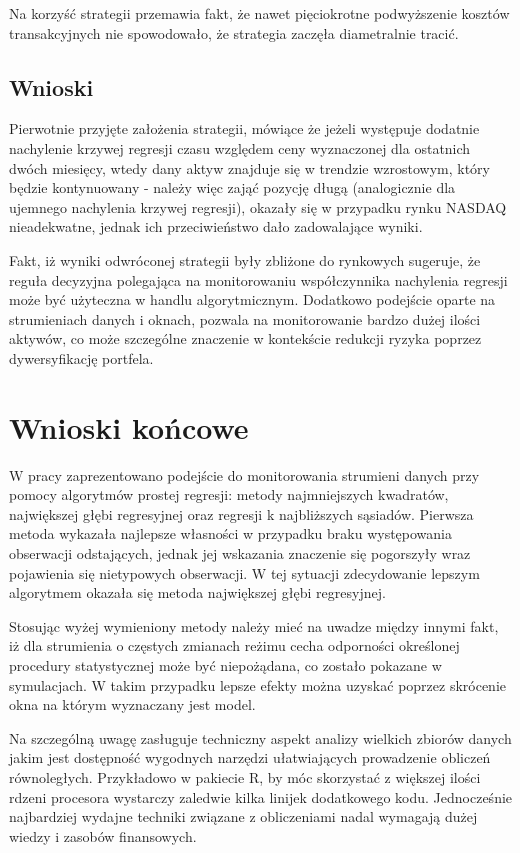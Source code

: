 \documentclass[man,mfu]{mgrwms}
\begin{document}
Na korzyść strategii przemawia fakt, że nawet pięciokrotne podwyższenie kosztów transakcyjnych nie spowodowało, że strategia zaczęła diametralnie tracić.

\section{Wnioski}

Pierwotnie przyjęte założenia strategii, mówiące że jeżeli występuje dodatnie nachylenie krzywej regresji czasu względem ceny wyznaczonej dla ostatnich dwóch miesięcy, wtedy dany aktyw znajduje się w trendzie wzrostowym, który będzie kontynuowany - należy więc zająć pozycję długą (analogicznie dla ujemnego nachylenia krzywej regresji), okazały się w przypadku rynku NASDAQ nieadekwatne, jednak ich przeciwieństwo dało zadowalające wyniki. 

Fakt, iż wyniki odwróconej strategii były zbliżone do rynkowych sugeruje, że reguła decyzyjna polegająca na monitorowaniu współczynnika nachylenia regresji może być użyteczna w handlu algorytmicznym. Dodatkowo podejście oparte na strumieniach danych i oknach, pozwala na monitorowanie bardzo dużej ilości aktywów, co może szczególne znaczenie w kontekście redukcji ryzyka poprzez dywersyfikację portfela.

\chapter{Wnioski końcowe}

W pracy zaprezentowano podejście do monitorowania strumieni danych przy pomocy  algorytmów prostej regresji: metody najmniejszych kwadratów, największej głębi regresyjnej oraz regresji k najbliższych sąsiadów. Pierwsza metoda wykazała najlepsze własności w przypadku braku występowania obserwacji odstających, jednak jej wskazania znaczenie się pogorszyły wraz pojawienia się nietypowych obserwacji. W tej sytuacji zdecydowanie lepszym algorytmem okazała się metoda największej głębi regresyjnej.

Stosując wyżej wymieniony metody należy mieć na uwadze między innymi fakt, iż dla strumienia o częstych zmianach reżimu cecha odporności określonej procedury statystycznej może być niepożądana, co zostało pokazane w symulacjach. W takim przypadku lepsze efekty można uzyskać poprzez skrócenie okna na którym wyznaczany jest model.

Na szczególną uwagę zasługuje techniczny aspekt analizy wielkich zbiorów danych jakim jest dostępność wygodnych narzędzi ułatwiających prowadzenie obliczeń równoległych. Przykładowo w pakiecie R, by móc skorzystać z większej ilości rdzeni procesora wystarczy zaledwie kilka linijek dodatkowego kodu. Jednocześnie najbardziej wydajne techniki związane z obliczeniami nadal wymagają dużej wiedzy i zasobów finansowych.

\newpage


\listoffigures	

\newpage
\listoftables

\newpage

%

\renewcommand\bibname{Literatura}

\end{document}
